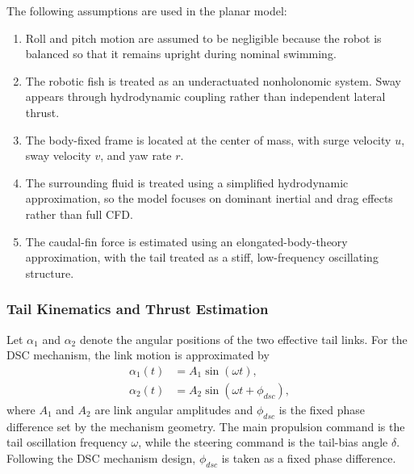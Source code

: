 \documentclass{uhcoethesis}
\begin{document}
The following assumptions are used in the planar model:
\begin{enumerate}
\item Roll and pitch motion are assumed to be negligible because the robot is balanced so that it remains upright during nominal swimming.
\item The robotic fish is treated as an underactuated nonholonomic system. Sway appears through hydrodynamic coupling rather than independent lateral thrust.
\item The body-fixed frame is located at the center of mass, with surge velocity $u$, sway velocity $v$, and yaw rate $r$.
\item The surrounding fluid is treated using a simplified hydrodynamic approximation, so the model focuses on dominant inertial and drag effects rather than full CFD.
\item The caudal-fin force is estimated using an elongated-body-theory approximation, with the tail treated as a stiff, low-frequency oscillating structure.
\end{enumerate}

\subsubsection{Tail Kinematics and Thrust Estimation}

Let $\alpha_1$ and $\alpha_2$ denote the angular positions of the two effective tail links. For the DSC mechanism, the link motion is approximated by
\begin{equation}
    \begin{aligned}
        \alpha_1(t) &= A_1 \sin(\omega t), \\
        \alpha_2(t) &= A_2 \sin(\omega t+\phi_{dsc}),
    \end{aligned}
    \label{eq:ch2_dsc_angles}
\end{equation}
where $A_1$ and $A_2$ are link angular amplitudes and $\phi_{dsc}$ is the fixed phase difference set by the mechanism geometry. The main propulsion command is the tail oscillation frequency $\omega$, while the steering command is the tail-bias angle $\delta$. Following the DSC mechanism design, $\phi_{dsc}$ is taken as a fixed phase difference.
\end{document}
